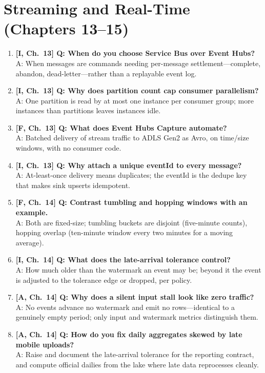 \section{Streaming and Real-Time (Chapters 13--15)}

\begin{enumerate}
    \item \textbf{[I, Ch.~13] Q: When do you choose Service Bus over Event Hubs?}\\
    A: When messages are commands needing per-message settlement---complete, abandon, dead-letter---rather than a replayable event log.
    \item \textbf{[I, Ch.~13] Q: Why does partition count cap consumer parallelism?}\\
    A: One partition is read by at most one instance per consumer group; more instances than partitions leaves instances idle.
    \item \textbf{[F, Ch.~13] Q: What does Event Hubs Capture automate?}\\
    A: Batched delivery of stream traffic to ADLS Gen2 as Avro, on time/size windows, with no consumer code.
    \item \textbf{[I, Ch.~13] Q: Why attach a unique eventId to every message?}\\
    A: At-least-once delivery means duplicates; the eventId is the dedupe key that makes sink upserts idempotent.
    \item \textbf{[F, Ch.~14] Q: Contrast tumbling and hopping windows with an example.}\\
    A: Both are fixed-size; tumbling buckets are disjoint (five-minute counts), hopping overlap (ten-minute window every two minutes for a moving average).
    \item \textbf{[I, Ch.~14] Q: What does the late-arrival tolerance control?}\\
    A: How much older than the watermark an event may be; beyond it the event is adjusted to the tolerance edge or dropped, per policy.
    \item \textbf{[A, Ch.~14] Q: Why does a silent input stall look like zero traffic?}\\
    A: No events advance no watermark and emit no rows---identical to a genuinely empty period; only input and watermark metrics distinguish them.
    \item \textbf{[A, Ch.~14] Q: How do you fix daily aggregates skewed by late mobile uploads?}\\
    A: Raise and document the late-arrival tolerance for the reporting contract, and compute official dailies from the lake where late data reprocesses cleanly.

\end{enumerate}
